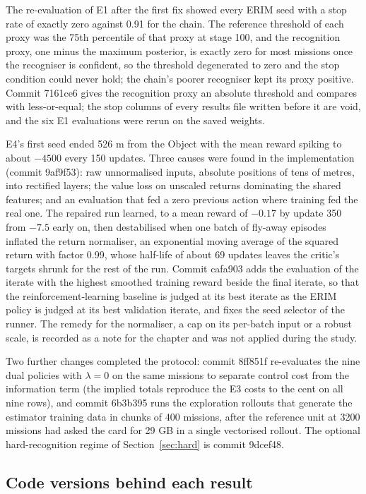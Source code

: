 \documentclass[11pt,a4paper]{article}
\begin{document}
The re-evaluation of E1 after the first fix showed every ERIM seed with a stop rate of exactly zero against 0.91 for the chain. The reference threshold of each proxy was the 75th percentile of that proxy at stage 100, and the recognition proxy, one minus the maximum posterior, is exactly zero for most missions once the recogniser is confident, so the threshold degenerated to zero and the stop condition could never hold; the chain's poorer recogniser kept its proxy positive. Commit 7161ce6 gives the recognition proxy an absolute threshold and compares with less-or-equal; the stop columns of every results file written before it are void, and the six E1 evaluations were rerun on the saved weights.

E4's first seed ended 526 m from the Object with the mean reward spiking to about $-4500$ every 150 updates. Three causes were found in the implementation (commit 9af9f53): raw unnormalised inputs, absolute positions of tens of metres, into rectified layers; the value loss on unscaled returns dominating the shared features; and an evaluation that fed a zero previous action where training fed the real one. The repaired run learned, to a mean reward of $-0.17$ by update 350 from $-7.5$ early on, then destabilised when one batch of fly-away episodes inflated the return normaliser, an exponential moving average of the squared return with factor 0.99, whose half-life of about 69 updates leaves the critic's targets shrunk for the rest of the run. Commit cafa903 adds the evaluation of the iterate with the highest smoothed training reward beside the final iterate, so that the reinforcement-learning baseline is judged at its best iterate as the ERIM policy is judged at its best validation iterate, and fixes the seed selector of the runner. The remedy for the normaliser, a cap on its per-batch input or a robust scale, is recorded as a note for the chapter and was not applied during the study.

Two further changes completed the protocol: commit 8ff851f re-evaluates the nine dual policies with $\lambda = 0$ on the same missions to separate control cost from the information term (the implied totals reproduce the E3 costs to the cent on all nine rows), and commit 6b3b395 runs the exploration rollouts that generate the estimator training data in chunks of 400 missions, after the reference unit at 3200 missions had asked the card for 29 GB in a single vectorised rollout. The optional hard-recognition regime of Section~\ref{sec:hard} is commit 9dcef48.

\subsection{Code versions behind each result}
\end{document}
